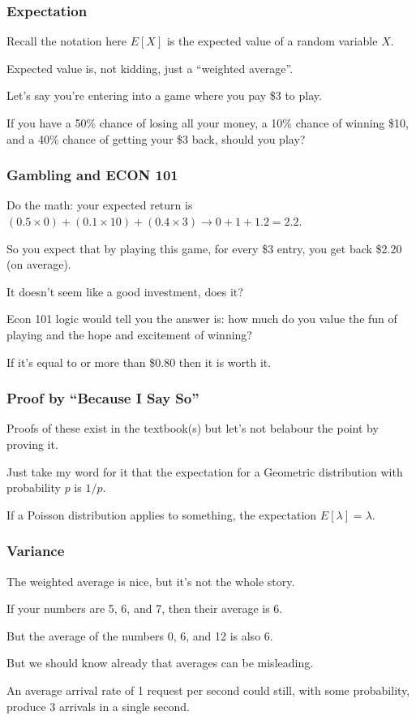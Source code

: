 \begin{frame}
\frametitle{Expectation}

Recall the notation here $E[X]$ is the expected value of a random variable $X$. 

Expected value is, not kidding, just a ``weighted average''. 

Let's say you're entering into a game where you pay \$3 to play. 

If you have a 50\% chance of losing all your money, a 10\% chance of winning \$10, and a 40\% chance of getting your \$3 back, should you play?

\end{frame}



\begin{frame}
\frametitle{Gambling and ECON 101}

Do the math: your expected return is $(0.5 \times 0) + (0.1 \times 10) + (0.4 \times 3) \rightarrow 0 + 1 + 1.2 = 2.2$. 

So you expect that by playing this game, for every \$3 entry, you get back \$2.20 (on average). 

It doesn't seem like a good investment, does it? 

Econ 101 logic would tell you the answer is: how much do you value the fun of playing and the hope and excitement of winning? 

If it's equal to or more than \$0.80 then it is worth it.

\end{frame}



\begin{frame}
\frametitle{Proof by ``Because I Say So''}

Proofs of these exist in the textbook(s) but let's not belabour the point by proving it. 

Just take my word for it that the expectation for a Geometric distribution with probability $p$ is $1/p$.

If a Poisson distribution applies to something, the expectation $E[\lambda] = \lambda$.


\end{frame}



\begin{frame}
\frametitle{Variance}

The weighted average is nice, but it's not the whole story. 

If your numbers are 5, 6, and 7, then their average is 6. 

But the average of the numbers 0, 6, and 12 is also 6. 

But we should know already that averages can be misleading.

An average arrival rate of 1 request per second could still, with some probability, produce 3 arrivals in a single second.

\end{frame}



